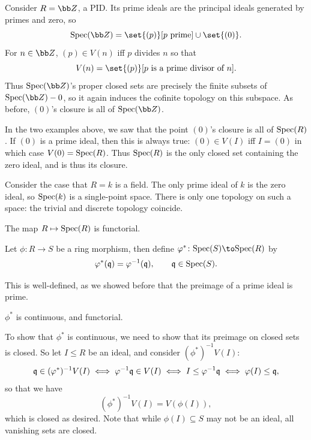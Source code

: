 \eexam

\bexam

    Consider $R=\bZ$, a PID.
    Its prime ideals are the principal ideals generated by primes and zero, so
    $$ \spec(\bZ) = \set{(p)}[\hbox{$p$ prime}] \cup \set{(0)} . $$
    For $n\in\bZ$, $(p)\in V(n)$ iff $p$ divides $n$ so that
    $$ V(n) = \set{(p)}[\hbox{$p$ is a prime divisor of $n$}] . $$
    Thus $\spec(\bZ)$'s proper closed sets are precisely the finite subsets of $\spec(\bZ)-0$, so it again induces the cofinite topology on this subspace.
    As before, $(0)$'s closure is all of $\spec(\bZ)$.

\eexam

In the two examples above, we saw that the point $(0)$'s closure is all of ${\rm Spec}(R)$.
If $(0)$ is a prime ideal, then this is always true: $(0)\in V(I)$ iff $I=(0)$ in which case $V(0)={\rm Spec}(R)$.
Thus ${\rm Spec}(R)$ is the only closed set containing the zero ideal, and is thus its closure.

\bexam

    Consider the case that $R=k$ is a field.
    The only prime ideal of $k$ is the zero ideal, so ${\rm Spec}(k)$ is a single-point space.
    There is only one topology on such a space: the trivial and discrete topology coincide.

\eexam

The map $R\mapsto{\rm Spec}(R)$ is functorial.

\bdefn

    Let $\phi\colon R\to S$ be a ring morphism, then define $\phi^*\colon\spec(S)\to\spec(R)$ by
    $$ \varphi^*({{\frak q}}) = \varphi^{-1}({{\frak q}}),\qquad {{\frak q}}\in{\rm Spec}(S) . $$

\edefn

This is well-defined, as we showed before that the preimage of a prime ideal is prime.

\bprop

    $\phi^*$ is continuous, and functorial.

\eprop

\bproof

    To show that $\phi^*$ is continuous, we need to show that its preimage on closed sets is closed.
    So let $I\leq R$ be an ideal, and consider $(\phi^*)^{-1}V(I)$:
    $$ {{\frak q}} \in (\varphi^*)^{-1}V(I) \iff \varphi^{-1}{{\frak q}} \in V(I) \iff I \leq \varphi^{-1}{{\frak q}} \iff \varphi(I) \leq {{\frak q}} , $$
    so that we have
    $$ (\phi^*)^{-1}V(I) = V(\phi(I)) , $$
    which is closed as desired.
    Note that while $\phi(I)\subseteq S$ may not be an ideal, all vanishing sets are closed.

